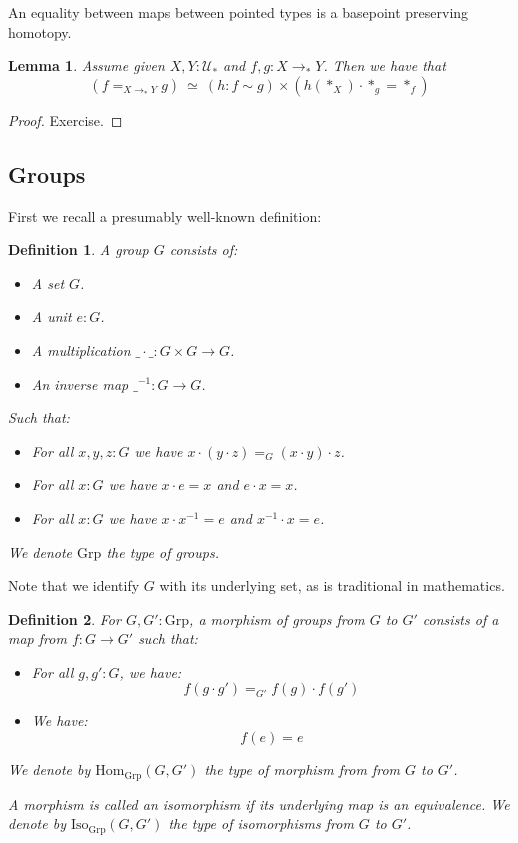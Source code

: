 \documentclass{article}
\newcommand{\sse}[1]{\medbreak \subsection{#1}}
\newcommand{\U}{{\mathcal U}}
\renewcommand{\r}{\rightarrow}
\newcommand{\Grp}{\mathrm{Grp}}
\newcommand{\Hom}{\mathrm{Hom}}
\newcommand{\Iso}{\mathrm{Iso}}
\newtheorem{lemma}{Lemma}
\newtheorem{definition}{Definition}
\begin{document}
An equality between maps between pointed types is a basepoint preserving homotopy.

\begin{lemma}
Assume given $X,Y:\U_*$ and $f,g:X\r_* Y$. Then we have that 
\[(f=_{X\r_*Y}g) \ \simeq \ (h:f\sim g)\times (h(*_X) \cdot *_g =  *_f) \]
\end{lemma}
\begin{proof}
Exercise.
\end{proof}



\sse{Groups}

First we recall a presumably well-known definition:

\begin{definition}
A group $G$ consists of:
\begin{itemize}
\item A set $G$.
\item A unit $e:G$.
\item A multiplication $\_\cdot\_ : G\times G\r G$.
\item An inverse map $\_^{-1} : G\r G$. 
\end{itemize}
Such that:
\begin{itemize}
\item For all $x,y,z:G$ we have $x\cdot(y\cdot z) =_G (x\cdot y)\cdot z$.
\item For all $x:G$ we have $x\cdot e = x$ and $e\cdot x =x$.
\item For all $x:G$ we have $x\cdot x^{-1} = e$ and $x^{-1}\cdot x = e$.
\end{itemize}
We denote $\Grp$ the type of groups. 
\end{definition}

Note that we identify $G$ with its underlying set, as is traditional in mathematics.

\begin{definition}
For $G,G':\Grp$, a morphism of groups from $G$ to $G'$ consists of a map from $f:G\r G'$ such that:
\begin{itemize}
\item For all $g,g':G$, we have: 
\[f(g\cdot g') =_{G'} f(g)\cdot f(g')\]
\item We have:
\[f(e) = e\]
\end{itemize}
We denote by $\Hom_{\Grp}(G,G')$ the type of morphism from from $G$ to $G'$. 

A morphism is called an isomorphism if its underlying map is an equivalence. We denote by $\Iso_{\Grp}(G,G')$ the type of isomorphisms from $G$ to $G'$.
\end{definition}
\end{document}
